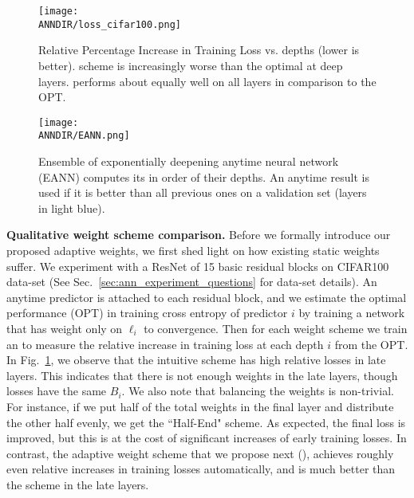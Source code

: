 \begin{figure}
    \centering
        \texttt{[image: \\ANNDIR/loss\_cifar100.png]}
    \caption{Relative Percentage Increase in Training Loss vs. depths (lower is better). \const scheme is increasingly worse than the optimal at deep layers. \adaloss performs about equally well on all layers in comparison to the OPT.}
    \label{fig:loss_cifar100}
\end{figure}

\begin{figure}
    \centering
    \texttt{[image: \\ANNDIR/EANN.png]}
    \caption{ Ensemble of exponentially deepening anytime neural network (EANN) computes its \anns in order of their depths. An anytime result is used if it is better than all previous ones on a validation set (layers in light blue).} 
     \label{fig:eann}
\end{figure}
    


\textbf{Qualitative weight scheme comparison.} Before we formally introduce our proposed adaptive weights, we first shed light on how existing static weights suffer. We experiment with a ResNet of 15 basic residual blocks on CIFAR100~\cite{cifar} data-set (See Sec.~\ref{sec:ann_experiment_questions} for data-set details). An anytime predictor is attached to each residual block, and we estimate the optimal performance (OPT) in training cross entropy of predictor $i$ by training a network that has weight only on $\ell_i$ to convergence. Then for each weight scheme we train an \ann to measure the relative increase in training loss at each depth $i$ from the OPT. In Fig.~\ref{fig:loss_cifar100}, we observe that the intuitive \const scheme has high relative losses in late layers. This indicates that there is not enough weights in the late layers, though losses have the same $B_i$.  We also note that balancing the weights is non-trivial. For instance, if we put half of the total weights in the final layer and distribute the other half evenly, we get the ``Half-End" scheme. As expected, the final loss is improved, but this is at the cost of significant increases of early training losses. In contrast, the adaptive weight scheme that we propose next (\adaloss), achieves roughly even relative increases in training losses automatically, and is much better than the \const scheme in the late layers.


